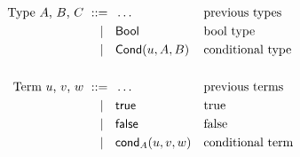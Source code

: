 \begin{align*}
  \text{Type $A$, $B$, $C$}
    \ \mathrel{{:}{:}{=}}\    {}& \ldots                   && \text{previous types}\\
    \ \mid\ \  {}& \mathsf{Bool}                    && \text{bool type} \\
    \ \mid\ \  {}& \mathsf{Cond}(u,A,B)       && \text{conditional type} \\
  \\
  \text{Term $u$, $v$, $w$}
    \ \mathrel{{:}{:}{=}}\    {}& \ldots                   && \text{previous terms} \\
    \ \mid\ \  {}& \mathsf{true}                    && \text{true} \\
    \ \mid\ \  {}& \mathsf{false}                   && \text{false} \\
    \ \mid\ \  {}& \mathsf{cond}_{A}(u,v,w) && \text{conditional term}
\end{align*}

\newcommand{\rlTyBool}{\referTo{ty-bool}{rul:ty-bool}}
\newcommand{\showTyBool}{%
  \infer[\rulename{ty-bool}] %
  {\isctx{\G}}
  {\istype{\G}{\Bool}}
}

\newcommand{\rlTyCond}{\referTo{ty-cond}{rul:ty-cond}}
\newcommand{\showTyCond}{%
  \infer[\rulename{ty-cond}] %
  {\isterm{\G}{\uu}{\Bool} \\
   \istype{\G}{\A} \\
   \istype{\G}{\B}
  }
  {\istype{\G}{\Cond{\uu}{\A}{\B}}}
}

\newcommand{\rlTermTrue}{\referTo{term-true}{rul:term-true}}
\newcommand{\showTermTrue}{%
  \infer[\rulename{term-true}] %
  {\isctx{\G}}
  {\isterm{\G}{\true}{\Bool}}
}

\newcommand{\rlTermFalse}{\referTo{term-false}{rul:term-false}}
\newcommand{\showTermFalse}{%
  \infer[\rulename{term-false}] %
  {\isctx{\G}}
  {\isterm{\G}{\false}{\Bool}}
}

\newcommand{\rlTermCond}{\referTo{term-cond}{rul:term-cond}}
\newcommand{\showTermCond}{%
  \infer[\rulename{term-cond}] %
  {\isterm{\G}{\uu}{\Bool} \\
   \istype{\ctxextend{\G}{\Bool}}{\C} \\
   \isterm{\G}{\vv}{\subst{\C}{\sbzero{\G}{\Bool}{\true}}} \\
   \isterm{\G}{\ww}{\subst{\C}{\sbzero{\G}{\Bool}{\false}}}
  }
  {\isterm{\G}{\cond{\C}{\uu}{\vv}{\ww}}{\subst{\C}{\sbzero{\G}{\Bool}{\uu}}}}
}

\newcommand{\rlEqTySubstBool}{\referTo{eq-ty-subst-bool}{rul:eq-ty-subst-bool}}
\newcommand{\showEqTySubstBool}{%
  \infer[\rulename{eq-ty-subst-bool}] %
  {\issubst{\sbs}{\G}{\D}}
  {\eqtype{\G}{\subst{\Bool}{\sbs}}{\Bool}}
}

